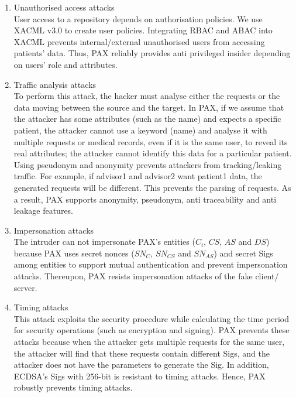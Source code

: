 \documentclass[journal,article,submit,moreauthors,pdftex]{Definitions/mdpi}
\begin{document}
\begin{enumerate}
  \item Unauthorised access attacks\\
User access to a repository depends on authorisation policies. We use XACML v3.0 to create user policies. Integrating RBAC and ABAC into XACML prevents internal/external unauthorised users from accessing patients' data. Thus, PAX reliably provides anti privileged insider depending on users' role and attributes.
  \item Traffic analysis attacks\\
To perform this attack, the hacker must analyse either the requests or the data moving between the source and the target. In PAX, if we assume that the attacker has some attributes (such as the name) and expects a specific patient, the attacker cannot use a keyword (name) and analyse it with multiple requests or medical records, even if it is the same user, to reveal its real attributes; the attacker cannot identify this data for a particular patient. Using pseudonym and anonymity prevents attackers from tracking/leaking traffic. For example, if advisor1 and advisor2 want patient1 data, the generated requests will be different. This prevents the parsing of requests. As a result, PAX supports anonymity, pseudonym, anti traceability and anti leakage features.
 \item Impersonation attacks\\
The intruder can not impersonate PAX’s entities ($C_i$, $CS$, $AS$ and $DS$) because PAX uses secret nonces ($SN_{C}$, $SN_{CS}$ and $SN_{AS}$) and secret Sigs among entities to support mutual authentication and prevent impersonation attacks. Thereupon, PAX resists impersonation attacks of the fake client/ server.
  \item Timing attacks\\
This attack exploits the security procedure while calculating the time period for security operations (such as encryption and signing). PAX prevents these attacks because when the attacker gets multiple requests for the same user, the attacker will find that these requests contain different Sigs, and the attacker does not have the parameters to generate the Sig. In addition, ECDSA’s Sigs with 256-bit is resistant to timing attacks. Hence, PAX robustly prevents timing attacks.
\end{enumerate}
\end{document}
